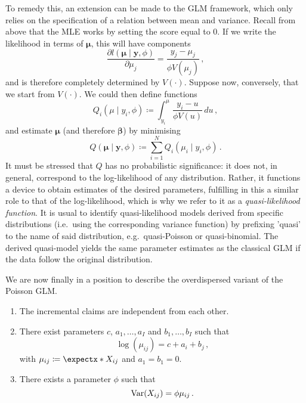 \documentclass[a4paper]{book}
\begin{document}
To remedy this, an extension can be made to the GLM framework, which only relies on the specification of a relation between mean and variance. Recall from above that the MLE works by setting the score equal to $0$. If we write the likelihood in terms of $\bm{\mu}$, this will have components
\begin{equation} \label{eq:lhood-mean-param}
  \frac{\partial l(\bm{\mu} \mid \mathbf{y}, \phi)}{\partial \mu_j} = \frac{y_j - \mu_j}{\phi V(\mu_j)} \,,
\end{equation}
and is therefore completely determined by $V(\cdot)$. Suppose now, conversely, that we start from $V(\cdot)$. We could then define functions
\begin{equation}
  Q_i(\mu \mid y_i, \phi) \coloneqq \int_{y_i}^{\mu} \frac{y_i - u}{\phi V(u)} \, du \,,
\end{equation}
and estimate $\bm{\mu}$ (and therefore $\bm{\beta}$) by minimising
\begin{equation}
  Q(\bm{\mu} \mid \mathbf{y}, \phi) \coloneqq \sum_{i = 1}^N Q_i(\mu_i \mid y_i, \phi) \,.
\end{equation}
It must be stressed that $Q$ has no probabilistic significance: it does not, in general, correspond to the log-likelihood of any distribution. Rather, it functions a device to obtain estimates of the desired parameters, fulfilling in this a similar role to that of the log-likelihood, which is why we refer to it as a \emph{quasi-likelihood function}. It is usual to identify quasi-likelihood models derived from specific distributions (i.e.\ using the corresponding variance function) by prefixing 'quasi' to the name of said distribution, e.g.\ quasi-Poisson or quasi-binomial. The derived quasi-model yields the same parameter estimates as the classical GLM if the data follow the original distribution.

We are now finally in a position to describe the overdispersed variant of the Poisson GLM.

\begin{model} \leavevmode \label{model:odp}
  \begin{enumerate}
      \item The incremental claims are independent from each other.
      \item There exist parameters $c$, $a_1, \dots, a_I$ and $b_1, \dots, b_I$ such that
      \begin{equation}
          \log(\mu_{ij}) = c + a_i + b_j \,,
      \end{equation}
      with $\mu_{ij} \coloneqq \expect{X_{ij}}$ and $a_1 = b_1 = 0$.
      \item There exists a parameter $\phi$ such that
      \begin{equation}
          \var{X_{ij}} = \phi \mu_{ij} \,.
      \end{equation}
  \end{enumerate}
\end{model}
\end{document}
